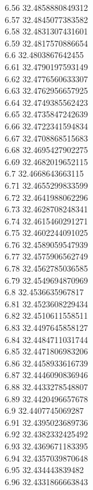 {6.56	32.4858880849312\\
6.57	32.4845077383582\\
6.58	32.4831307431601\\
6.59	32.4817570886654\\
6.6	32.4803867642455\\
6.61	32.4790197593149\\
6.62	32.4776560633307\\
6.63	32.4762956657925\\
6.64	32.4749385562423\\
6.65	32.4735847242639\\
6.66	32.4722341594834\\
6.67	32.4708868515683\\
6.68	32.4695427902275\\
6.69	32.4682019652115\\
6.7	32.4668643663115\\
6.71	32.4655299833599\\
6.72	32.4641988062296\\
6.73	32.4628708248341\\
6.74	32.4615460291271\\
6.75	32.4602244091025\\
6.76	32.4589059547939\\
6.77	32.4575906562749\\
6.78	32.4562785036585\\
6.79	32.4549694870969\\
6.8	32.4536635967817\\
6.81	32.4523608229434\\
6.82	32.4510611558511\\
6.83	32.4497645858127\\
6.84	32.4484711031744\\
6.85	32.4471806983206\\
6.86	32.4458933616739\\
6.87	32.4446090836946\\
6.88	32.4433278548807\\
6.89	32.4420496657678\\
6.9	32.4407745069287\\
6.91	32.4395023689736\\
6.92	32.4382332425492\\
6.93	32.4369671183395\\
6.94	32.4357039870648\\
6.95	32.434443839482\\
6.96	32.4331866663843\\
}
